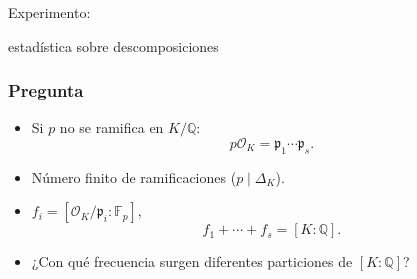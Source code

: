 \documentclass{beamer}
\newcommand{\FF}{\mathbb{F}}
\newcommand{\QQ}{\mathbb{Q}}
\renewcommand{\O}{\mathcal{O}}
\begin{document}

\begin{frame}[plain]
  \headingfont

  \begin{center}
    {\huge Experimento:

      estadística sobre descomposiciones

    }
  \end{center}
\end{frame}


\begin{frame}[fragile]
  \frametitle{Pregunta}

  \begin{itemize}
  \item Si $p$ no se ramifica en $K/\QQ$:
    $$p\O_K = \mathfrak{p}_1\cdots\mathfrak{p}_s.$$

  \item Número finito de ramificaciones ($p \mid \Delta_K$).

  \item $f_i = [\O_K/\mathfrak{p}_i : \FF_p]$,
    $$f_1 + \cdots + f_s = [K : \QQ].$$

  \item ¿Con qué frecuencia surgen diferentes particiones de $[K : \QQ]$?
  \end{itemize}
\end{frame}

\end{document}
